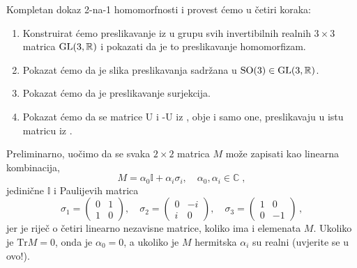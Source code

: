 Kompletan dokaz 2-na-1 homomorfnosti  i  provest ćemo
u četiri koraka:
\begin{enumerate}
    \item Konstruirat ćemo preslikavanje iz  u grupu svih invertibilnih realnih
        $3\times 3$ matrica $\mathrm{GL}(3, \mathbb{R})$ i pokazati da je to preslikavanje homomorfizam.
    \item Pokazat ćemo da je slika preslikavanja sadržana u $\mathrm{SO}(3) \in \mathrm{GL}(3, \mathbb{R})$.
    \item Pokazat ćemo da je preslikavanje surjekcija.
    \item Pokazat ćemo da se matrice U i -U iz , obje i samo one, preslikavaju u 
        istu matricu iz .
\end{enumerate}
Preliminarno, uočimo da se svaka $2\times 2$ matrica $M$ može zapisati kao linearna
kombinacija,
\begin{equation}
M = \alpha_0 \mathbb{I} + \alpha_i \sigma_i, \quad \alpha_0, \alpha_i \in \mathbb{C}\;,
\end{equation}
jedinične $\mathbb{I}$ i Paulijevih matrica 
\begin{equation}
\sigma_1 = \begin{pmatrix} 0 & 1 \\ 1 & 0 \end{pmatrix}, \quad
\sigma_2 = \begin{pmatrix} 0 & -i \\ i & 0 \end{pmatrix}, \quad
\sigma_3 = \begin{pmatrix} 1 & 0 \\ 0 & -1 \end{pmatrix}\,,
\label{eq:paulijevematrice}
\end{equation}
jer je riječ o četiri linearno nezavisne matrice, koliko ima i elemenata $M$.
Ukoliko je $\mathrm{Tr} M = 0$,
onda je $\alpha_0 = 0$, a ukoliko je $M$ hermitska $\alpha_i$ su realni
(uvjerite se u ovo!).

